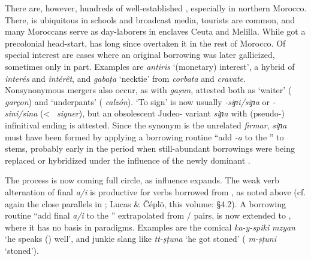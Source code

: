 \documentclass[output=paper]{langsci/langscibook}
\begin{document}
There are, however, hundreds of well-established  , especially in northern Morocco. There,  is ubiquitous in schools and broadcast media,  tourists are common, and many Moroccans serve as day-laborers in  enclaves Ceuta and Melilla. While  got a precolonial head-start,  has long since overtaken it in the rest of Morocco. Of special interest are cases where an original  borrowing was later gallicized, sometimes only in part. Examples are  \textit{antiris} ‘(monetary) interest’, a hybrid of  \textit{interés} and  \textit{intérêt}, and  \textit{g{\R}abaṭa} ‘necktie’ from  \textit{corbata} and  \textit{cravate}. Nonsynonymous mergers also occur, as with \textit{ga{\R}ṣun}, attested both as ‘waiter’ ( \textit{garçon}) and ‘underpants’ ( \textit{calzón}). ‘To sign’ is now usually \textit{\nobreakdash-siɲi/siɲa} or \textit{\nobreakdash-sini/sina} (<~ \textit{signer}), but an obsolescent Judeo- variant \textit{siɲa{\R}} with (pseudo-) infinitival ending is attested. Since the  synonym is the unrelated \textit{firmar},  \textit{siɲa{\R}} must have been formed by applying a borrowing routine “add \textit{-a{\R}} to the ” to  stems, probably early in the  period when still-abundant  borrowings were being replaced or hybridized under the influence of the newly dominant .

The process is now coming full circle, as  influence expands. The weak verb alternation of final \textit{a/i} is productive for verbs borrowed from , as noted above (cf. again the close parallels in ; Lucas \& Čéplö, this volume: §4.2).  A borrowing routine “add final \textit{a/i} to the ” extrapolated from / pairs, is now extended to , where it has no basis in   paradigms. Examples are the comical \textit{ka-y-spiki} \textit{mzyan} ‘he speaks () well’, and junkie slang like \textit{tt-ṣṭuna} ‘he got stoned’ ( \textit{m-ṣṭuni} ‘stoned’). 
\end{document}
